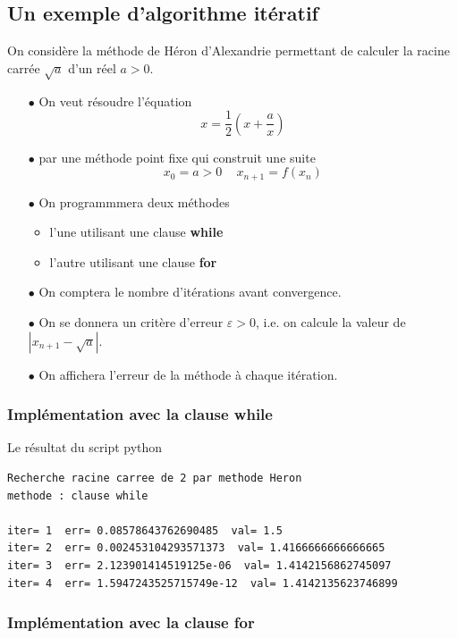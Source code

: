\documentclass[a4paper,12pt]{article}
\begin{document}
\subsection{Un exemple d'algorithme it\'eratif}
\begin{leftbar}
On consid\`ere la m\'ethode de H\'eron d'Alexandrie permettant de calculer la racine carr\'ee $\sqrt{a}$ d'un r\'eel $a>0$.
\begin{itemize}
\item[$\bullet$] On veut r\'esoudre l'\'equation
	\[
		x=\frac{1}{2}\left(x+\frac{a}{x}\right)	
	\]
\item[$\bullet$]  par une m\'ethode point fixe qui construit une suite 
	\[
		x_0=a>0\,\quad{}x_{n+1}=f(x_n)	
	\]
\item[$\bullet$]  On programmmera deux m\'ethodes
	\begin{itemize}
	\item l'une utilisant une clause {\textbf{while}}
	\item l'autre utilisant une clause {\textbf{for}}
	\end{itemize}
\item[$\bullet$]  On comptera le nombre d'it\'erations avant convergence.
\item[$\bullet$]  On se donnera un crit\`ere d'erreur $\varepsilon >0$, i.e. on calcule la valeur de $\left|x_{n+1}-\sqrt{a}\right|$.
\item[$\bullet$]  On affichera l'erreur de la m\'ethode \`a chaque it\'eration.
\end{itemize}		
\end{leftbar} 

\subsubsection{Impl\'ementation avec la clause {\textbf{while}}}


Le r\'esultat du script python

\begin{verbatim}
Recherche racine carree de 2 par methode Heron
methode : clause while

iter= 1  err= 0.08578643762690485  val= 1.5
iter= 2  err= 0.002453104293571373  val= 1.4166666666666665
iter= 3  err= 2.123901414519125e-06  val= 1.4142156862745097
iter= 4  err= 1.5947243525715749e-12  val= 1.4142135623746899
\end{verbatim} 

\clearpage
\subsubsection{Impl\'ementation avec la clause {\textbf{for}}}
\end{document}

